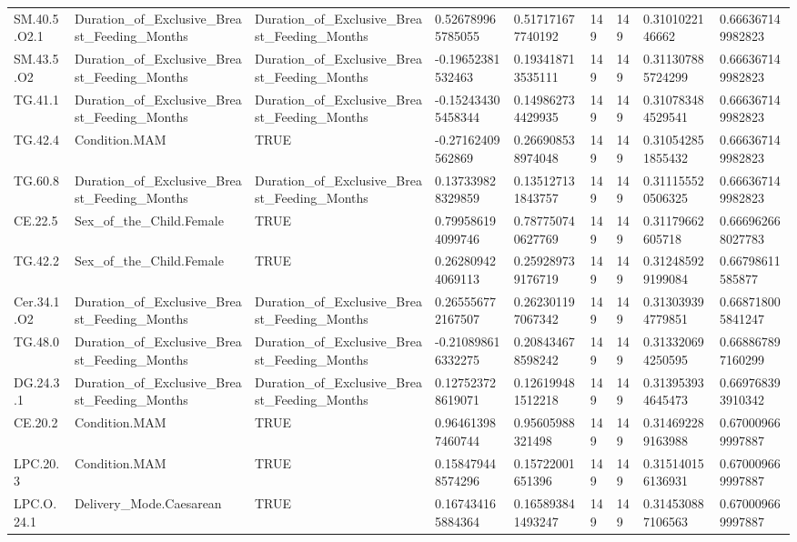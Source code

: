 \begin{longtable}{lllllllll}
SM.40.5.O2.1 & Duration\_of\_Exclusive\_Breast\_Feeding\_Months & Duration\_of\_Exclusive\_Breast\_Feeding\_Months & 0.526789965785055 & 0.517171677740192 & 149 & 149 & 0.3101022146662 & 0.666367149982823 \\
SM.43.5.O2 & Duration\_of\_Exclusive\_Breast\_Feeding\_Months & Duration\_of\_Exclusive\_Breast\_Feeding\_Months & -0.19652381532463 & 0.193418713535111 & 149 & 149 & 0.311307885724299 & 0.666367149982823 \\
TG.41.1 & Duration\_of\_Exclusive\_Breast\_Feeding\_Months & Duration\_of\_Exclusive\_Breast\_Feeding\_Months & -0.152434305458344 & 0.149862734429935 & 149 & 149 & 0.310783484529541 & 0.666367149982823 \\
TG.42.4 & Condition.MAM & TRUE & -0.27162409562869 & 0.266908538974048 & 149 & 149 & 0.310542851855432 & 0.666367149982823 \\
TG.60.8 & Duration\_of\_Exclusive\_Breast\_Feeding\_Months & Duration\_of\_Exclusive\_Breast\_Feeding\_Months & 0.137339828329859 & 0.135127131843757 & 149 & 149 & 0.311155520506325 & 0.666367149982823 \\
CE.22.5 & Sex\_of\_the\_Child.Female & TRUE & 0.799586194099746 & 0.787750740627769 & 149 & 149 & 0.31179662605718 & 0.666962668027783 \\
TG.42.2 & Sex\_of\_the\_Child.Female & TRUE & 0.262809424069113 & 0.259289739176719 & 149 & 149 & 0.312485929199084 & 0.66798611585877 \\
Cer.34.1.O2 & Duration\_of\_Exclusive\_Breast\_Feeding\_Months & Duration\_of\_Exclusive\_Breast\_Feeding\_Months & 0.265556772167507 & 0.262301197067342 & 149 & 149 & 0.313039394779851 & 0.668718005841247 \\
TG.48.0 & Duration\_of\_Exclusive\_Breast\_Feeding\_Months & Duration\_of\_Exclusive\_Breast\_Feeding\_Months & -0.210898616332275 & 0.208434678598242 & 149 & 149 & 0.313320694250595 & 0.668867897160299 \\
DG.24.3.1 & Duration\_of\_Exclusive\_Breast\_Feeding\_Months & Duration\_of\_Exclusive\_Breast\_Feeding\_Months & 0.127523728619071 & 0.126199481512218 & 149 & 149 & 0.313953934645473 & 0.669768393910342 \\
CE.20.2 & Condition.MAM & TRUE & 0.964613987460744 & 0.95605988321498 & 149 & 149 & 0.314692289163988 & 0.670009669997887 \\
LPC.20.3 & Condition.MAM & TRUE & 0.158479448574296 & 0.15722001651396 & 149 & 149 & 0.315140156136931 & 0.670009669997887 \\
LPC.O.24.1 & Delivery\_Mode.Caesarean & TRUE & 0.167434165884364 & 0.165893841493247 & 149 & 149 & 0.314530887106563 & 0.670009669997887 \\

\end{longtable}

